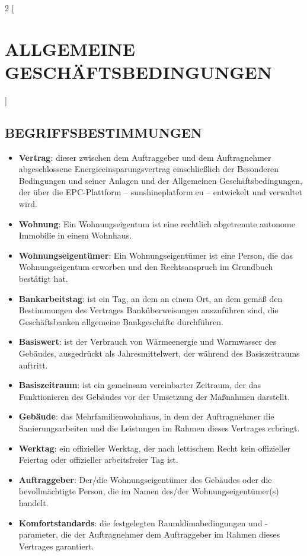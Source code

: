 \begin{multicols}{2}
  [\section{ALLGEMEINE GESCHÄFTSBEDINGUNGEN}]

  \subsection{BEGRIFFSBESTIMMUNGEN}

  \begin{itemize}[label={}]
  \item\textbf{Vertrag}: dieser zwischen dem Auftraggeber und dem Auftragnehmer abgeschlossene Energieeinsparungsvertrag einschließlich der Besonderen Bedingungen und seiner Anlagen und der Allgemeinen Geschäftsbedingungen, der über die EPC-Plattform – sunshineplatform.eu – entwickelt und verwaltet wird.
  \item\textbf{Wohnung}: Ein Wohnungseigentum ist eine rechtlich abgetrennte autonome Immobilie in einem Wohnhaus.
  \item\textbf{Wohnungseigentümer}: Ein Wohnungseigentümer ist eine Person, die das Wohnungseigentum erworben und den Rechtsanspruch im Grundbuch bestätigt hat.
  \item\textbf{Bankarbeitstag}: ist ein Tag, an dem an einem Ort, an dem gemäß den Bestimmungen des Vertrages Banküberweisungen auszuführen sind, die Geschäftsbanken allgemeine Bankgeschäfte durchführen.
  \item\textbf{Basiswert}: ist der Verbrauch von Wärmeenergie und Warmwasser des Gebäudes, ausgedrückt als Jahresmittelwert, der während des Basiszeitraums auftritt.
  \item\textbf{Basiszeitraum}: ist ein gemeinsam vereinbarter Zeitraum, der das Funktionieren des Gebäudes vor der Umsetzung der Maßnahmen darstellt.
  \item\textbf{Gebäude}: das Mehrfamilienwohnhaus, in dem der Auftragnehmer die Sanierungsarbeiten und die Leistungen im Rahmen dieses Vertrages erbringt.
  \item\textbf{Werktag}: ein offizieller Werktag, der nach lettischem Recht kein offizieller Feiertag oder offizieller arbeitsfreier Tag ist.
  \item\textbf{Auftraggeber}: Der/die Wohnungseigentümer des Gebäudes oder die bevollmächtigte Person, die im Namen des/der Wohnungseigentümer(s) handelt.
  \item\textbf{Komfortstandards}: die festgelegten Raumklimabedingungen und -parameter, die der Auftragnehmer dem Auftraggeber im Rahmen dieses Vertrages garantiert.

\end{itemize}
\end{multicols}
